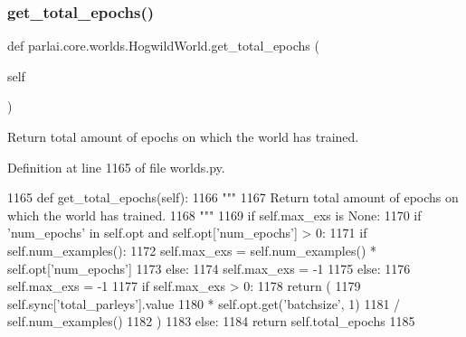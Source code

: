 \subsubsection{\texorpdfstring{get\+\_\+total\+\_\+epochs()}{get\_total\_epochs()}}
{\footnotesize\ttfamily def parlai.\+core.\+worlds.\+Hogwild\+World.\+get\+\_\+total\+\_\+epochs (\begin{DoxyParamCaption}\item[{}]{self }\end{DoxyParamCaption})}

\begin{DoxyVerb}Return total amount of epochs on which the world has trained.
\end{DoxyVerb}
 

Definition at line 1165 of file worlds.\+py.


\begin{DoxyCode}
1165     \textcolor{keyword}{def }get\_total\_epochs(self):
1166         \textcolor{stringliteral}{"""}
1167 \textcolor{stringliteral}{        Return total amount of epochs on which the world has trained.}
1168 \textcolor{stringliteral}{        """}
1169         \textcolor{keywordflow}{if} self.max\_exs \textcolor{keywordflow}{is} \textcolor{keywordtype}{None}:
1170             \textcolor{keywordflow}{if} \textcolor{stringliteral}{'num\_epochs'} \textcolor{keywordflow}{in} self.opt \textcolor{keywordflow}{and} self.opt[\textcolor{stringliteral}{'num\_epochs'}] > 0:
1171                 \textcolor{keywordflow}{if} self.num\_examples():
1172                     self.max\_exs = self.num\_examples() * self.opt[\textcolor{stringliteral}{'num\_epochs'}]
1173                 \textcolor{keywordflow}{else}:
1174                     self.max\_exs = -1
1175             \textcolor{keywordflow}{else}:
1176                 self.max\_exs = -1
1177         \textcolor{keywordflow}{if} self.max\_exs > 0:
1178             \textcolor{keywordflow}{return} (
1179                 self.sync[\textcolor{stringliteral}{'total\_parleys'}].value
1180                 * self.opt.get(\textcolor{stringliteral}{'batchsize'}, 1)
1181                 / self.num\_examples()
1182             )
1183         \textcolor{keywordflow}{else}:
1184             \textcolor{keywordflow}{return} self.total\_epochs
1185 
\end{DoxyCode}
\mbox{\label{classparlai_1_1core_1_1worlds_1_1HogwildWorld_a0e26cfad1c63628cb43f554c470426b9}} 
